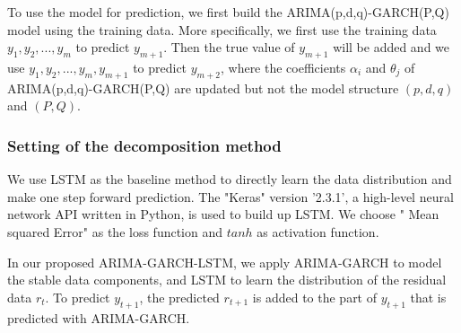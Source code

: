 



To use the model for prediction, we first build the ARIMA(p,d,q)-GARCH(P,Q)  model using the training data. More specifically,  we first use the training data ${y_1,y_2,...,y_m}$ to predict $y_{m+1}$. Then the true value of $y_{m+1}$ will be added and we use ${y_1,y_2,...,y_m,y_{m+1}}$ to predict $y_{m+2}$, %
where the coefficients $\alpha_i$ and $\theta_j$ of ARIMA(p,d,q)-GARCH(P,Q) are updated but not the model structure $(p,d,q)$ and $(P,Q)$.

\subsubsection{Setting of the decomposition method}




We use LSTM  as  the baseline method to directly learn the data distribution and make one step forward prediction.  The "Keras" version '2.3.1', a high-level neural network API written in Python, is used to build up LSTM. 
We choose " Mean squared Error" as the loss function and  $tanh$ as activation function.

In our proposed ARIMA-GARCH-LSTM, we apply ARIMA-GARCH to model the stable data components, and LSTM  to learn the distribution of the residual data ${r_t}$.  
To predict ${y_{t+1}}$, the predicted ${r_{t+1}}$ is added to the part of ${y_{t+1}}$ that is predicted with ARIMA-GARCH.



